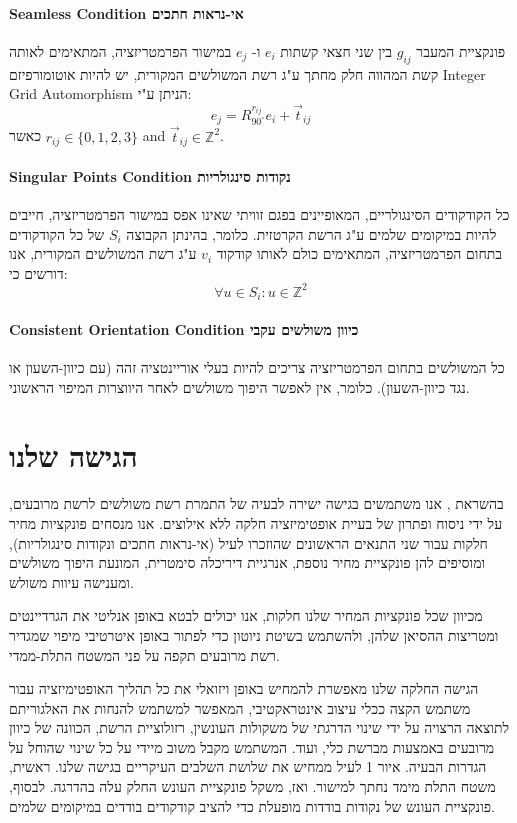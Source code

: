 \documentclass{article}
\begin{document}
\paragraph{\foreignlanguage{english}{Seamless Condition} אי-נראות חתכים}
פונקציית המעבר
$ g_ {ij} $
בין שני חצאי קשתות
$ e_i $
ו-
$ e_j $
במישור הפרמטריזציה, המתאימים לאותה קשת המהווה חלק מחתך ע"ג רשת המשולשים המקורית, יש להיות אוטומורפיזם
\foreignlanguage{english}{Integer Grid Automorphism}
הניתן ע"י:
$$e_j = R^{r_{ij}}_{90^\circ}e_i + \vec{t}_{ij}$$
  כאשר
$r_{ij} \in \{0,1,2,3\}$ and $\vec{t}_{ij} \in \mathbb{Z}^2$.
\paragraph{\foreignlanguage{english}{Singular Points Condition} נקודות סינגולריות}
כל הקודקודים הסינגולריים, המאופיינים בפגם
זוויתי שאינו אפס במישור הפרמטריזציה, חייבים
להיות במיקומים שלמים ע"ג הרשת הקרטזית.
כלומר, בהינתן הקבוצה
$S_i$
של כל הקודקודים בתחום הפרמטריזציה, המתאימים כולם לאותו קודקוד
$v_i$
ע"ג רשת המשולשים המקורית, אנו דורשים כי:
$$\forall u \in S_i: u \in \mathbb{Z}^2 $$
\paragraph{\foreignlanguage{english}{Consistent Orientation Condition} כיוון משולשים עקבי}
כל המשולשים בתחום הפרמטריזציה צריכים להיות בעלי אוריינטציה זהה (עם כיוון-השעון או נגד כיוון-השעון). כלומר, אין לאפשר היפוך משולשים לאחר היווצרות המיפוי הראשוני.

\section{הגישה שלנו}
בהשראת \cite{Poranne:Autocuts:2017}, אנו משתמשים בגישה ישירה לבעיה של התמרת רשת משולשים לרשת מרובעים, על ידי ניסוח ופתרון של בעיית אופטימיזציה חלקה ללא אילוצים. אנו מנסחים פונקציות מחיר חלקות עבור שני התנאים הראשונים שהוזכרו לעיל (אי-נראות חתכים ונקודות סינגולריות), ומוסיפים להן פונקציית מחיר נוספת, אנרגיית דיריכלה סימטרית, המונעת היפוך משולשים ומענישה עיוות משולש.

מכיוון שכל פונקציות המחיר שלנו חלקות, אנו יכולים לבטא באופן אנליטי את הגרדיינטים ומטריצות ההסיאן שלהן, ולהשתמש בשיטת ניוטון כדי לפתור באופן איטרטיבי מיפוי שמגדיר רשת מרובעים תקפה על פני המשטח התלת-ממדי.

הגישה החלקה שלנו מאפשרת להמחיש באופן ויזואלי את כל תהליך האופטימיזציה עבור משתמש הקצה ככלי עיצוב אינטראקטיבי, המאפשר למשתמש להנחות את האלגוריתם לתוצאה הרצויה על ידי שינוי הדרגתי של משקולות העונשין, רזולוציית הרשת, הכוונה של כיוון מרובעים באמצעות מברשת כלי, ועוד. המשתמש מקבל משוב מיידי על כל שינוי שהוחל על הגדרות הבעיה. איור
1 לעיל
ממחיש את שלושת השלבים העיקריים בגישה שלנו. ראשית, משטח התלת מימד נחתך למישור. ואז, משקל פונקציית העונש החלק עלה בהדרגה. לבסוף, פונקציית העונש של נקודות בודדות מופעלת כדי להציב קודקודים בודדים במיקומים שלמים.
\end{document}
